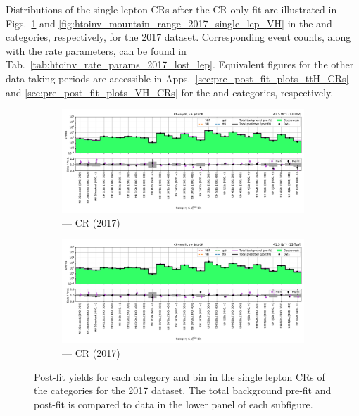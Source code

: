 Distributions of the single lepton \glspl{CR} after the \gls{CR}-only fit are illustrated in Figs.~\ref{fig:htoinv_mountain_range_2017_single_lep_ttH} and \ref{fig:htoinv_mountain_range_2017_single_lep_VH} in the \ttH and \VH categories, respectively, for the 2017 dataset. Corresponding event counts, along with the rate parameters, can be found in Tab.~\ref{tab:htoinv_rate_params_2017_lost_lep}. Equivalent figures for the other data taking periods are accessible in Apps.~\ref{sec:pre_post_fit_plots_ttH_CRs} and \ref{sec:pre_post_fit_plots_VH_CRs} for the \ttH and \VH categories, respectively.

\begin{figure}[htbp]
    \centering
    \begin{subfigure}[b]{\textwidth}
        \includegraphics[width=\textwidth]{chapters/higgstoinv/figures/mountain_ranges/2017/ttH/Wmunu_tree_fit_b-abs_values_ttH_cats.pdf}
        \caption{\ttH --- \singleMuCr \gls{CR} (2017)}
    \end{subfigure}

    \begin{subfigure}[b]{\textwidth}
        \includegraphics[width=\textwidth]{chapters/higgstoinv/figures/mountain_ranges/2017/ttH/Wenu_tree_fit_b-abs_values_ttH_cats.pdf}
        \caption{\ttH --- \singleEleCr \gls{CR} (2017)}
    \end{subfigure}
    \caption[Post-fit yields for each category and \ptmiss bin in the single lepton control regions of the \ttH categories for the 2017 dataset]{Post-fit yields for each category and \ptmiss bin in the single lepton \glspl{CR} of the \ttH categories for the 2017 dataset. The total background pre-fit and post-fit is compared to data in the lower panel of each subfigure.}
    \label{fig:htoinv_mountain_range_2017_single_lep_ttH}
\end{figure}

